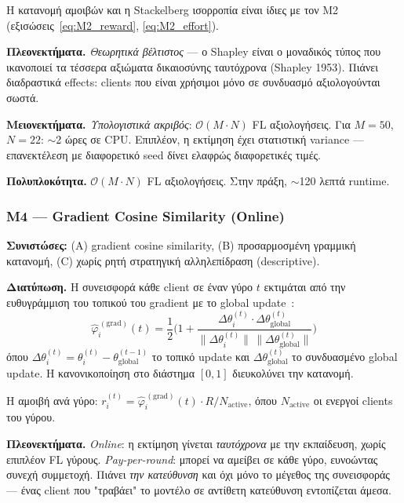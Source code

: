 Η κατανομή αμοιβών και η Stackelberg ισορροπία είναι ίδιες με τον M2 (εξισώσεις~\ref{eq:M2_reward},
\ref{eq:M2_effort}).

\textbf{Πλεονεκτήματα.} \emph{Θεωρητικά βέλτιστος} — ο Shapley είναι ο μοναδικός τύπος που ικανοποιεί
τα τέσσερα αξιώματα δικαιοσύνης ταυτόχρονα (Shapley 1953). Πιάνει διαδραστικά effects: clients που
είναι χρήσιμοι μόνο σε συνδυασμό αξιολογούνται σωστά.

\textbf{Μειονεκτήματα.} \emph{Υπολογιστικά ακριβός}: $\mathcal{O}(M \cdot N)$ FL αξιολογήσεις. Για
$M=50$, $N=22$: $\sim$2 ώρες σε CPU. Επιπλέον, η εκτίμηση έχει στατιστική variance — επανεκτέλεση με
διαφορετικό seed δίνει ελαφρώς διαφορετικές τιμές.

\textbf{Πολυπλοκότητα.} $\mathcal{O}(M \cdot N)$ FL αξιολογήσεις. Στην πράξη, $\sim$120 λεπτά runtime.

\subsubsection{M4 — Gradient Cosine Similarity (Online)}
\label{subsubsec:M4_gradient}

\textbf{Συνιστώσες:} (A) gradient cosine similarity, (B) προσαρμοσμένη γραμμική κατανομή, (C) χωρίς
ρητή στρατηγική αλληλεπίδραση (descriptive).

\textbf{Διατύπωση.} Η συνεισφορά κάθε client σε έναν γύρο $t$ εκτιμάται από την ευθυγράμμιση του
τοπικού του gradient με το global update~\cite{Xu2021}:
\begin{equation}
    \hat{\varphi}_i^{\,(\text{grad})}(t) =
    \frac{1}{2}\Big(1 + \frac{\Delta\theta_i^{(t)} \cdot \Delta\theta_{\text{global}}^{(t)}}
                                  {\|\Delta\theta_i^{(t)}\| \, \|\Delta\theta_{\text{global}}^{(t)}\|}\Big)
    \label{eq:M4_cossim}
\end{equation}
όπου $\Delta\theta_i^{(t)} = \theta_i^{(t)} - \theta_{\text{global}}^{(t-1)}$ το τοπικό update και
$\Delta\theta_{\text{global}}^{(t)}$ το συνδυασμένο global update. Η κανονικοποίηση στο διάστημα
$[0,1]$ διευκολύνει την κατανομή.

Η αμοιβή ανά γύρο: $r_i^{(t)} = \hat{\varphi}_i^{\,(\text{grad})}(t) \cdot R / N_{\text{active}}$,
όπου $N_{\text{active}}$ οι ενεργοί clients του γύρου.

\textbf{Πλεονεκτήματα.} \emph{Online}: η εκτίμηση γίνεται \emph{ταυτόχρονα} με την εκπαίδευση, χωρίς
επιπλέον FL γύρους. \emph{Pay-per-round}: μπορεί να αμείβει σε κάθε γύρο, ευνοώντας συνεχή συμμετοχή.
Πιάνει \emph{την κατεύθυνση} και όχι μόνο το μέγεθος της συνεισφοράς — ένας client που "τραβάει" το
μοντέλο σε αντίθετη κατεύθυνση εντοπίζεται άμεσα.

